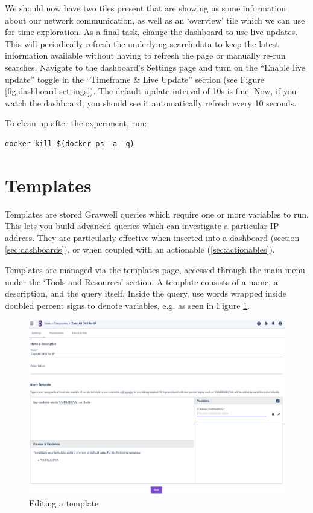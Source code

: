 We should now have two tiles present that are showing us some information
about our network communication, as well as an `overview' tile which we
can use for time exploration. As a final task, change the dashboard to use
live updates. This will periodically refresh the underlying search data
to keep the latest information available without having to refresh the
page or manually re-run searches. Navigate to the dashboard's Settings
page and turn on the ``Enable live update'' toggle in the ``Timeframe
\& Live Update'' section (see Figure \ref{fig:dashboard-settings}). The default update interval of 10s is fine.
Now, if you watch the dashboard, you should see it automatically refresh
every 10 seconds.

To clean up after the experiment, run:

\begin{Verbatim}[breaklines=true]
docker kill $(docker ps -a -q)
\end{Verbatim}

\section{Templates}
Templates are stored Gravwell queries which require one or more variables to run. This lets you build advanced queries which can investigate a particular IP address. They are particularly effective when inserted into a dashboard (section \ref{sec:dashboards}), or when coupled with an actionable (\ref{sec:actionables}).

Templates are managed via the templates page, accessed through the main menu under the `Tools and Resources' section. A template consists of a name, a description, and the query itself. Inside the query, use words wrapped inside doubled percent signs to denote variables, e.g.  as seen in Figure \ref{fig:template-editor}.

\begin{figure}
	\includegraphics[width=0.9\linewidth]{images/template-editor.png}
	\caption{Editing a template}
	\label{fig:template-editor}
\end{figure}

